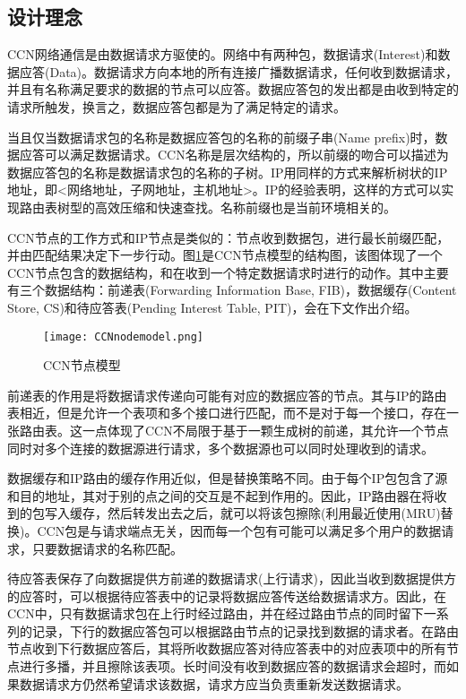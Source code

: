 \subsection*{设计理念}
\par
CCN网络通信是由数据请求方驱使的。网络中有两种包，数据请求(Interest)和数据应答(Data)。数据请求方向本地的所有连接广播数据请求，任何收到数据请求，并且有名称满足要求的数据的节点可以应答。数据应答包的发出都是由收到特定的请求所触发，换言之，数据应答包都是为了满足特定的请求。
\par
当且仅当数据请求包的名称是数据应答包的名称的前缀子串(Name prefix)时，数据应答可以满足数据请求。CCN名称是层次结构的，所以前缀的吻合可以描述为数据应答包的名称是数据请求包的名称的子树。IP用同样的方式来解析树状的IP地址，即<网络地址，子网地址，主机地址>。IP的经验表明，这样的方式可以实现路由表树型的高效压缩和快速查找。名称前缀也是当前环境相关的。
\par
CCN节点的工作方式和IP节点是类似的：节点收到数据包，进行最长前缀匹配，并由匹配结果决定下一步行动。图\ref{fig:NodeLogic}是CCN节点模型的结构图，该图体现了一个CCN节点包含的数据结构，和在收到一个特定数据请求时进行的动作。其中主要有三个数据结构：前递表(Forwarding Information Base, FIB)，数据缓存(Content Store, CS)和待应答表(Pending Interest Table, PIT)，会在下文作出介绍。\cite{NDNDSRef}
\begin{figure}[h!]
	\centering
	\texttt{[image: CCNnodemodel.png]}
	\caption{CCN节点模型}
	\label{fig:NodeLogic}
\end{figure}
\par
前递表的作用是将数据请求传递向可能有对应的数据应答的节点。其与IP的路由表相近，但是允许一个表项和多个接口进行匹配，而不是对于每一个接口，存在一张路由表。这一点体现了CCN不局限于基于一颗生成树的前递，其允许一个节点同时对多个连接的数据源进行请求，多个数据源也可以同时处理收到的请求。
\par
数据缓存和IP路由的缓存作用近似，但是替换策略不同。由于每个IP包包含了源和目的地址，其对于别的点之间的交互是不起到作用的。因此，IP路由器在将收到的包写入缓存，然后转发出去之后，就可以将该包擦除(利用最近使用(MRU)替换)。CCN包是与请求端点无关，因而每一个包有可能可以满足多个用户的数据请求，只要数据请求的名称匹配。
\par
待应答表保存了向数据提供方前递的数据请求(上行请求)，因此当收到数据提供方的应答时，可以根据待应答表中的记录将数据应答传送给数据请求方。因此，在CCN中，只有数据请求包在上行时经过路由，并在经过路由节点的同时留下一系列的记录，下行的数据应答包可以根据路由节点的记录找到数据的请求者。在路由节点收到下行数据应答后，其将所收数据应答对待应答表中的对应表项中的所有节点进行多播，并且擦除该表项。长时间没有收到数据应答的数据请求会超时，而如果数据请求方仍然希望请求该数据，请求方应当负责重新发送数据请求。
